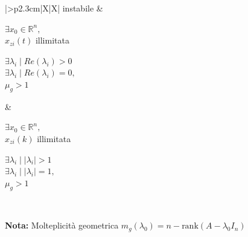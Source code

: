 \documentclass[10pt,a4paper]{article}
\begin{document}
\begin{center}
{{\begin{minipage}{0.83\textwidth}
\begin{tabularx}{\textwidth}{|>{\itshape}p{2.3cm}|X|X|}
\hline
instabile & 
\parbox[t]{0.45\linewidth}{$\exists x_0 \in \mathbb{R}^n,$\\$x_{zi}(t)$ illimitata} \hfill
\parbox[t]{0.45\linewidth}{$\exists \lambda_i \mid Re(\lambda_i) > 0 $\\$\exists \lambda_i \mid Re(\lambda_i) = 0,$\\$\mu_g > 1$} & 
\parbox[t]{0.45\linewidth}{$\exists x_0 \in \mathbb{R}^n,$\\$x_{zi}(k)$ illimitata} \hfill
\parbox[t]{0.45\linewidth}{$\exists \lambda_i \mid |\lambda_i| > 1 $\\$\exists \lambda_i \mid |\lambda_i| = 1,$\\$\mu_g > 1$} \\
\hline
\end{tabularx}
\end{minipage}

\vspace{4pt}
\textbf{Nota:} Molteplicità geometrica \quad $m_g(\lambda_0) = n - \text{rank}(A - \lambda_0 I_n)$
}}
\end{center}

\vspace{-1.5mm}
\end{document}
